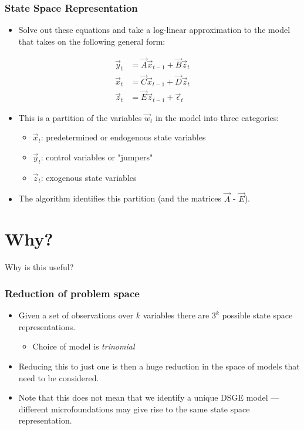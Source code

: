 \documentclass{beamer}
\begin{document}
\begin{frame}
    \frametitle{State Space Representation}
    \begin{itemize}
        \item Solve out these equations and take a log-linear approximation to the model that takes on the following general form: 
    \end{itemize}
        \begin{align}
            \vec{y}_t &= \vec{A} \vec{x}_{t-1} + \vec{B} \vec{z}_{t} \label{ss_solution:x}\\
            \vec{x}_t &= \vec{C} \vec{x}_{t-1} + \vec{D} \vec{z}_{t} \label{ss_solution:y}\\
            \vec{z}_t &= \vec{E} \vec{z}_{t-1} + \vec{\epsilon}_{t} \label{ss_solution:z}
        \end{align}
    \begin{itemize}
        \item This is a partition of the variables $\vec{w}_t$ in the model into three categories:
        \begin{itemize}
            \item $\vec{x}_t$: predetermined or endogenous state variables
            \item $\vec{y}_t$: control variables or "jumpers"
            \item $\vec{z}_t$: exogenous state variables
        \end{itemize}
        \item The algorithm identifies this partition (and the matrices $\vec{A}$ - $\vec{E}$).
    \end{itemize}
\end{frame}

\section{Why?}

\begin{frame}
    \centering
    \huge
    Why is this useful?
\end{frame}

\begin{frame}
    \frametitle{Reduction of problem space}
    \begin{itemize}
        \item Given a set of observations over $k$ variables there are $3^k$ possible state space representations.
        \begin{itemize}
            \item Choice of model is \textit{trinomial}
        \end{itemize}
        \item Reducing this to just one is then a huge reduction in the space of models that need to be considered.
        \item Note that this does not mean that we identify a unique DSGE model --- different microfoundations may give rise to the same state space representation.
    \end{itemize}
\end{frame}
\end{document}
